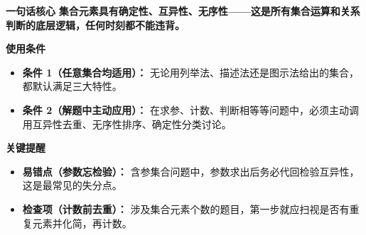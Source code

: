 \begin{summarybox}
	\textbf{\textcolor{CSummary}{一句话核心}}
	\textbf{集合元素具有确定性、互异性、无序性——这是所有集合运算和关系判断的底层逻辑，任何时刻都不能违背。}

	\medskip
	\textbf{\textcolor{CSummary}{使用条件}}
	\begin{itemize}[leftmargin=*, itemsep=0.5em, topsep=0.4em]
		\item \textbf{条件 1（任意集合均适用）：} 无论用列举法、描述法还是图示法给出的集合，都默认满足三大特性。
		\item \textbf{条件 2（解题中主动应用）：} 在求参、计数、判断相等等问题中，必须主动调用互异性去重、无序性排序、确定性分类讨论。
	\end{itemize}

	\medskip
	\textbf{\textcolor{CSummary}{关键提醒}}
	\begin{itemize}[leftmargin=*, itemsep=0.5em, topsep=0.4em]
		\item \textbf{易错点（参数忘检验）：} 含参集合问题中，参数求出后务必代回检验互异性，这是最常见的失分点。
		\item \textbf{检查项（计数前去重）：} 涉及集合元素个数的题目，第一步就应扫视是否有重复元素并化简，再计数。
	\end{itemize}

\end{summarybox}

